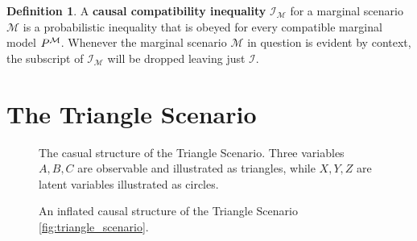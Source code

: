 \documentclass[aps, 10pt, english, twoside, pra, nofootinbib, longbibliography]{revtex4-1}
\theoremstyle{plain}
\theoremstyle{definition}
\newtheorem{definition}[theorem]{Definition}
\theoremstyle{remark}
\newcommand{\mscenario}{\mathcal{M}}
\newcommand{\term}[1]{\textcolor{Mahogany}{\textbf{#1}}}
\begin{document}
    \begin{definition}
        A \term{causal compatibility inequality} $\mathcal{I}_{\mscenario}$ for a marginal scenario $\mscenario$ is a probabilistic inequality that is obeyed for every compatible marginal model $\prob^{\mscenario}$. Whenever the marginal scenario $\mscenario$ in question is evident by context, the subscript of $\mathcal{I}_{\mscenario}$ will be dropped leaving just $\mathcal{I}$.
    \end{definition}


    \section{The Triangle Scenario}
    \label{sec:triangle_scenario}
    \begin{figure}
    \begin{center}
        \begin{minipage}[b]{.48\textwidth}
            \centering
            \scalebox{1.0}{}
            \caption{The casual structure of the Triangle Scenario. Three variables $A,B,C$ are observable and illustrated as triangles, while $X, Y, Z$ are latent variables illustrated as circles.}
            \label{fig:triangle_scenario}
        \end{minipage}\hspace{0.04\textwidth}%
        \begin{minipage}[b]{.48\textwidth}
            \centering
            \scalebox{0.8}{}
            \caption{An inflated causal structure of the Triangle Scenario \cref{fig:triangle_scenario}.}
            \label{fig:inflated_triangle_scenario}
        \end{minipage}
    \end{center}
    \end{figure}
\end{document}
